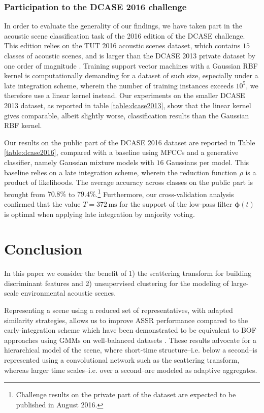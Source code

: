 \documentclass[journal]{IEEEtran}
\makeatletter
\newcommand*{\ie}{i.e.\@\xspace}
\makeatother
\begin{document}
\subsubsection*{Participation to the DCASE 2016 challenge}
In order to evaluate the generality of our findings, we have taken part in the acoustic scene classification task of the 2016 edition of the DCASE challenge.
This edition relies on the TUT 2016 acoustic scenes dataset, which contains $15$ classes of acoustic scenes, and is larger than the DCASE 2013 private dataset by one order of magnitude \cite{Mesaros2016_EUSIPCO}.
Training support vector machines with a Gaussian RBF kernel is computationally demanding for a dataset of such size, especially under a late integration scheme, wherein the number of training instances exceeds $10^5$, we therefore use a linear kernel instead.
Our experiments on the smaller DCASE 2013 dataset, as reported in table \ref{table:dcase2013}, show that the linear kernel gives comparable, albeit slightly worse, classification results than the Gaussian RBF kernel.

Our results on the public part of the DCASE 2016 dataset are reported in Table \ref{table:dcase2016}, compared with a baseline using MFCCs and a generative classifier, namely Gaussian mixture models with $16$ Gaussians per model. This baseline relies on a late integration scheme, wherein the reduction function $\rho$ is a product of likelihoods.
The average accuracy across classes on the public part is brought from $70.8\%$ to $79.4\%$.\footnote{Challenge results on the private part of the dataset are expected to be published in August 2016.}
Furthermore, our cross-validation analysis confirmed that the value $T=372\,\mathrm{ms}$ for the support of the low-pass filter $\boldsymbol{\phi}(t)$ is optimal when applying late integration by majority voting.

\section{Conclusion}

In this paper we consider the benefit of 1) the scattering transform for building discriminant features and 2) unsupervised clustering for the modeling of large-scale environmental acoustic scenes.

Representing a scene using a reduced set of representatives, with adapted similarity strategies, allows us to improve ASSR performance compared to the early-integration scheme which have been demonstrated to be equivalent to BOF approaches using GMMs on well-balanced datasets \cite{lagrange:hal-01082501}. These results advocate for a hierarchical model of the scene, where short-time structure--\ie below a second--is represented using a convolutional network such as the scattering transform, whereas larger time scales--\ie over a second--are modeled as adaptive aggregates.
\end{document}
